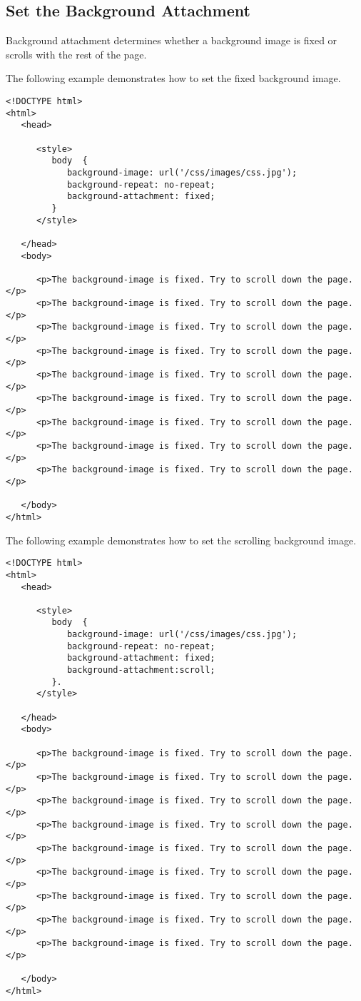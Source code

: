 \documentclass[a4paper,oneside]{book}
\numberwithin{equation}{chapter}
\begin{document}
\subsection{Set the Background Attachment}
Background attachment determines whether a background image is fixed or scrolls with the rest of the page.

The following example demonstrates how to set the fixed background image.
\begin{verbatim}
<!DOCTYPE html>
<html>
   <head>
   
      <style>
         body  {
            background-image: url('/css/images/css.jpg');
            background-repeat: no-repeat;
            background-attachment: fixed;
         }
      </style>
      
   </head>
   <body>
   
      <p>The background-image is fixed. Try to scroll down the page.</p>
      <p>The background-image is fixed. Try to scroll down the page.</p>
      <p>The background-image is fixed. Try to scroll down the page.</p>
      <p>The background-image is fixed. Try to scroll down the page.</p>
      <p>The background-image is fixed. Try to scroll down the page.</p>
      <p>The background-image is fixed. Try to scroll down the page.</p>
      <p>The background-image is fixed. Try to scroll down the page.</p>
      <p>The background-image is fixed. Try to scroll down the page.</p>
      <p>The background-image is fixed. Try to scroll down the page.</p>
      
   </body>
</html>
\end{verbatim}

The following example demonstrates how to set the scrolling background image.
\begin{verbatim}
<!DOCTYPE html>
<html>
   <head>
   
      <style>
         body  {
            background-image: url('/css/images/css.jpg');
            background-repeat: no-repeat;
            background-attachment: fixed;
            background-attachment:scroll;
         }.
      </style>
      
   </head>
   <body>
   
      <p>The background-image is fixed. Try to scroll down the page.</p>
      <p>The background-image is fixed. Try to scroll down the page.</p>
      <p>The background-image is fixed. Try to scroll down the page.</p>
      <p>The background-image is fixed. Try to scroll down the page.</p>
      <p>The background-image is fixed. Try to scroll down the page.</p>
      <p>The background-image is fixed. Try to scroll down the page.</p>
      <p>The background-image is fixed. Try to scroll down the page.</p>
      <p>The background-image is fixed. Try to scroll down the page.</p>
      <p>The background-image is fixed. Try to scroll down the page.</p>
      
   </body>
</html>
\end{verbatim}
\end{document}
